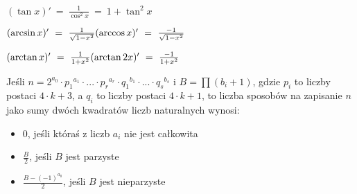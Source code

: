 $(\tan x)'\ =\ \frac{1}{\cos^2 x}\ =\ 1 + \tan^2 x$

$(\arcsin x)'\ =\ \frac{1}{\sqrt{1-x^2}} \hfill
	(\arccos x)'\ =\ \frac{-1}{\sqrt{1-x^2}}$

$(\arctan x)'\ =\ \frac{1}{1+x^2} \hfill
	(\arctan2 x)'\ =\ \frac{-1}{1+x^2}$

Jeśli $n=2^{a_0} \cdot {p_1}^{a_1} \cdot ... \cdot {p_r}^{a_r} \cdot {q_1}^{b_1} \cdot ... \cdot {q_s}^{b_s}$ i $B= \prod (b_i+1)$, gdzie $p_i$ to liczby postaci $4 \cdot k + 3$, a $q_i$ to liczby postaci $4 \cdot k + 1$, to liczba sposobów na zapisanie $n$ jako sumy dwóch kwadratów liczb naturalnych wynosi:
      \begin{itemize}
        \item 0, jeśli któraś z liczb $a_i$ nie jest całkowita
        \item $\frac{B}{2}$, jeśli $B$ jest parzyste
        \item $\frac{B-(-1)^{a_0}}{2}$, jeśli $B$ jest nieparzyste
      \end{itemize}

